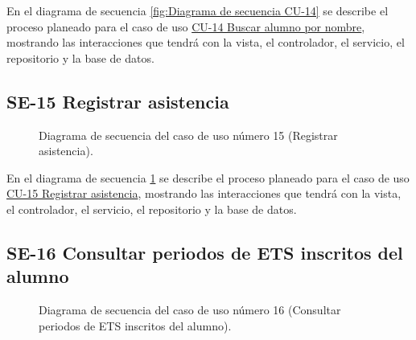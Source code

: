 En el diagrama de secuencia \ref{fig:Diagrama de secuencia CU-14} se describe el proceso planeado para el caso de uso \hyperlink{CU-14}{CU-14 Buscar alumno por nombre}, mostrando las interacciones que tendrá con la vista, el controlador, el servicio, el repositorio y la base de datos.

\newpage

\subsection{SE-15 Registrar asistencia}

\begin{figure}[htbp!]
	\begin{center}
		\caption{Diagrama de secuencia del caso de uso número 15 (Registrar asistencia).}
		\label{fig:Diagrama de secuencia CU-15}
	\end{center}
\end{figure}

En el diagrama de secuencia \ref{fig:Diagrama de secuencia CU-15} se describe el proceso planeado para el caso de uso \hyperlink{CU-15}{CU-15 Registrar asistencia}, mostrando las interacciones que tendrá con la vista, el controlador, el servicio, el repositorio y la base de datos.

\subsection{SE-16 Consultar periodos de ETS inscritos del alumno}

\begin{figure}[htbp!]
	\begin{center}
		\caption{Diagrama de secuencia del caso de uso número 16 (Consultar periodos de ETS inscritos del alumno).}
		\label{fig:Diagrama de secuencia CU-16}
	\end{center}
\end{figure}

